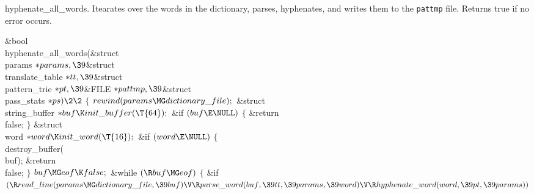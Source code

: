 hyphenate\_all\_words.
Itearates over the words in the dictionary, parses, hyphenates, and writes them
to the {\tt pattmp}
file. Returns true if no error occurs.

\Y\B\1\1\&{bool} \\{hyphenate\_all\_words}(\&{struct} \\{params} ${}{*}%
\\{params},\39{}$\&{struct} \\{translate\_table} ${}{*}\\{tt},\39{}$\&{struct} %
\\{pattern\_trie} ${}{*}\\{pt},\39{}$\&{FILE} ${}{*}\\{pattmp},\39{}$\&{struct}
\\{pass\_stats} ${}{*}\\{ps})\2\2{}$\6
${}\{{}$\1\6
${}\\{rewind}(\\{params}\MG\\{dictionary\_file});{}$\7
\&{struct} \\{string\_buffer} ${}{*}\\{buf}\K\\{init\_buffer}(\T{64});{}$\7
\&{if} ${}(\\{buf}\E\NULL){}$\5
${}\{{}$\1\6
\&{return} \\{false};\6
\4${}\}{}$\2\7
\&{struct} \\{word} ${}{*}\\{word}\K\\{init\_word}(\T{16});{}$\7
\&{if} ${}(\\{word}\E\NULL){}$\5
${}\{{}$\1\6
\\{destroy\_buffer}(\\{buf});\6
\&{return} \\{false};\6
\4${}\}{}$\2\6
${}\\{buf}\MG\\{eof}\K\\{false};{}$\6
\&{while} ${}(\R\\{buf}\MG\\{eof}){}$\5
${}\{{}$\1\6
\&{if} ${}(\R\\{read\_line}(\\{params}\MG\\{dictionary\_file},\39\\{buf})\V\R%
\\{parse\_word}(\\{buf},\39\\{tt},\39\\{params},\39\\{word})\V\R\\{hyphenate%
\_word}(\\{word},\39\\{pt},\39\\{params})){}$\5
